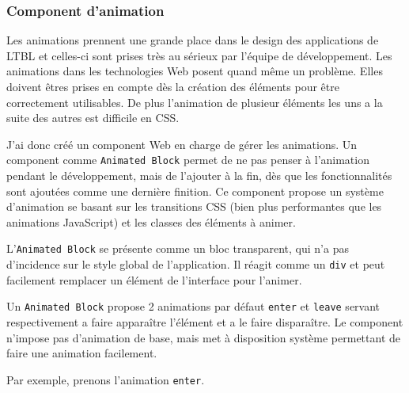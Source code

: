 \subsubsection{Component d'animation}
\label{animationblock}

Les animations prennent une grande place dans le design des applications de LTBL et celles-ci sont prises très au sérieux par l'équipe de développement.
Les animations dans les technologies Web posent quand même un problème.
Elles doivent êtres prises en compte dès la création des éléments pour être correctement utilisables.
De plus l'animation de plusieur éléments les uns a la suite des autres est difficile en CSS.

J'ai donc créé un component Web en charge de gérer les animations.
Un component comme \texttt{Animated Block} permet de ne pas penser à l'animation pendant le développement, mais de l'ajouter à la fin, dès que les fonctionnalités sont ajoutées comme une dernière finition.
Ce component propose un système d'animation se basant sur les transitions CSS (bien plus performantes que les animations JavaScript) et les classes des éléments à animer.

L'\texttt{Animated Block} se présente comme un bloc transparent, qui n'a pas d'incidence sur le style global de l'application.
Il réagit comme un \texttt{div} et peut facilement remplacer un élément de l'interface pour l'animer.

Un \texttt{Animated Block} propose 2 animations par défaut \texttt{enter} et \texttt{leave} servant respectivement a faire apparaître l'élément et a le faire disparaître.
Le component n'impose pas d'animation de base, mais met à disposition système permettant de faire une animation facilement.

Par exemple, prenons l'animation \texttt{enter}.

